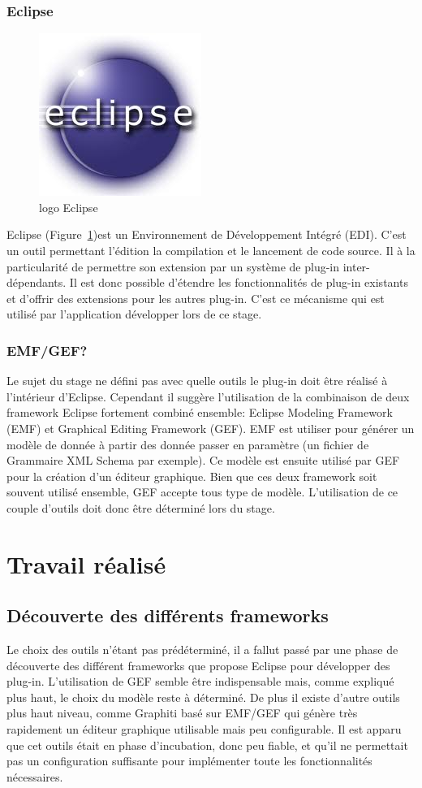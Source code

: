 \documentclass{article}
\begin{document}
	\subsubsection{Eclipse}
		\begin{figure}[!h]
		  \raggedright
		  \includegraphics[scale=0.3]{img/logo_eclipse.jpeg}
		  \caption{logo Eclipse}
		  \label{logo_eclipse}
		\end{figure}
		Eclipse (Figure~\ref{logo_eclipse})est un Environnement de Développement Intégré (EDI). C'est un outil permettant l'édition la compilation et le lancement de code source. Il à la particularité de permettre son extension par un système de plug-in inter-dépendants. Il est donc possible d'étendre les fonctionnalités de plug-in existants et d'offrir des extensions pour les autres plug-in. C'est ce mécanisme qui est utilisé par l'application développer lors de ce stage.
	\subsubsection{EMF/GEF?}
	Le sujet du stage ne défini pas avec quelle outils le plug-in doit être réalisé à l'intérieur d'Eclipse. Cependant il suggère l'utilisation de la combinaison de deux framework Eclipse fortement combiné ensemble: Eclipse Modeling Framework (EMF) et Graphical Editing Framework (GEF). EMF est utiliser pour générer un modèle de donnée à partir des donnée passer en paramètre (un fichier de Grammaire XML Schema par exemple). Ce modèle est ensuite utilisé par GEF pour la création d'un éditeur graphique. Bien que ces deux framework soit souvent utilisé ensemble, GEF accepte tous type de modèle. L'utilisation de ce couple d'outils doit donc être déterminé lors du stage.

\section{Travail réalisé}
    \subsection{Découverte des différents frameworks}
    	Le choix des outils n'étant pas prédéterminé, il a fallut passé par une phase de découverte des différent frameworks que propose Eclipse pour développer des plug-in. L'utilisation de GEF semble être indispensable mais, comme expliqué plus haut, le choix du modèle reste à déterminé. De plus il existe d'autre outils plus haut niveau, comme Graphiti basé sur EMF/GEF qui génère très rapidement un éditeur graphique utilisable mais peu configurable. Il est apparu que cet outils était en phase d'incubation, donc peu fiable, et qu'il ne permettait pas un configuration suffisante pour implémenter toute les fonctionnalités nécessaires.
\end{document}
